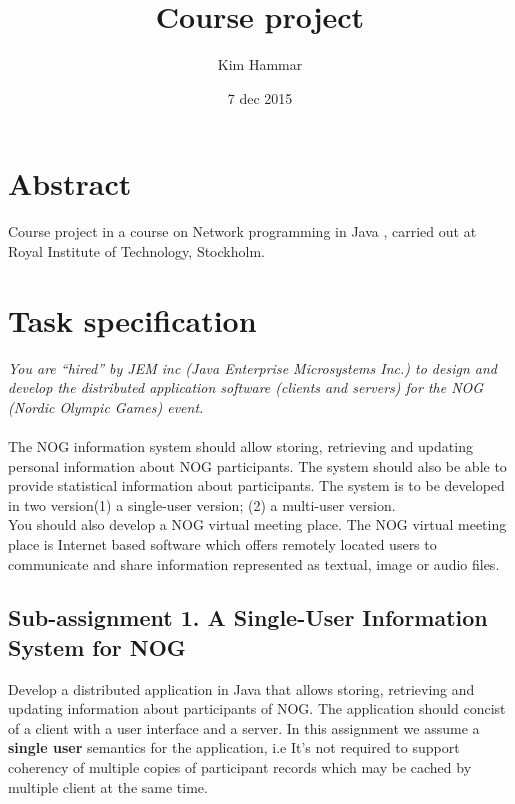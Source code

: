 \documentclass[a4paper, 11pt]{article}
\title{Course project}
\author{Kim Hammar}
\date{7 dec 2015}
\begin{document}
\maketitle
\thispagestyle{firststyle}
\begin{versionhistory}
\end{versionhistory}
\newpage
\tableofcontents
\newpage

\section{Abstract}
Course project in a course on Network programming in Java \citep{kth_1}, carried out at Royal Institute of Technology, Stockholm.
\newpage
\section{Task specification}
\textit{You are ``hired'' by JEM inc (Java Enterprise Microsystems Inc.) to design and develop the distributed application software (clients and servers) for the NOG (Nordic Olympic Games) event.} \\ \\
The NOG information system should allow storing, retrieving and updating personal information about NOG participants. The system should also be able to provide statistical information about participants. The system is to be developed in two version(1) a single-user version; (2) a multi-user version. \\ 
You should also develop a NOG virtual meeting place. The NOG virtual meeting place is Internet based software which offers remotely located users to communicate and share information represented as textual, image or audio files. 
\subsection{Sub-assignment 1. A Single-User Information System for NOG}
Develop a distributed application in Java that allows storing, retrieving and updating information about participants of NOG. The application should concist of a client with a user interface and a server. In this assignment we assume a \textbf{single user} semantics for the application, i.e It's not required to support coherency of multiple copies of participant records which may be cached by multiple client at the same time.
\end{document}
